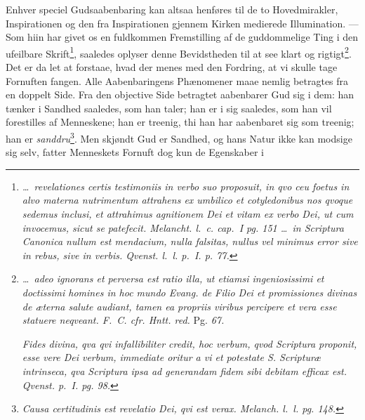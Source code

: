 \documentclass[12pt]{book}
\newcommand{\opage}[1]{\marginnote{\footnotesize\textit{[#1]}}}
\begin{document}
Enhver speciel Gudsaabenbaring kan altsaa henføres til de to Hovedmirakler,
Inspirationen og den fra Inspirationen gjennem Kirken medierede Illumination.
--- Som hiin har givet os en fuldkommen Fremstilling af de guddommelige Ting
i den ufeilbare Skrift\footnote{\textit{\ldots\ revelationes certis
testimoniis in verbo suo proposuit, in qvo ceu foetus in alvo materna
nutrimentum attrahens ex umbilico et cotyledonibus nos qvoque sedemus
inclusi, et attrahimus agnitionem Dei et vitam ex verbo Dei, ut cum
invocemus, sicut se patefecit. Melancht. l.~c. cap.~I pg. 151 \ldots\ in
Scriptura Canonica nullum est mendacium, nulla falsitas, nullus vel minimus
error sive in rebus, sive in verbis. Qvenst. l.~l. p.~I. p. 77.}}, saaledes
oplyser denne Bevidstheden
\opage{77} \setcounter{footnote}{0}%
til at see klart og rigtigt\footnote{\textit{\ldots\ adeo ignorans et perversa
est ratio illa, ut etiamsi ingeniosissimi et doctissimi homines in hoc mundo
Evang. de Filio Dei et promissiones divinas de æterna salute audiant, tamen
ea propriis viribus percipere et vera esse statuere neqveant. F.~C. cfr.
Hntt. red.} Pg. \textit{67.}

\textit{Fides divina, qva qvi infallibiliter credit, hoc verbum, qvod
Scriptura proponit, esse vere Dei verbum, immediate oritur a vi et potestate
S. Scripturæ intrinseca, qva Scriptura ipsa ad generandam fidem sibi debitam
efficax est. Qvenst. p.~I. pg. 98.}}. Det er da let at forstaae, hvad der
menes med den Fordring, at vi skulle tage Fornuften fangen. Alle
Aabenbaringens Phænomener maae nemlig betragtes fra en doppelt Side. Fra den
objective Side betragtet aabenbarer Gud sig i dem: han tænker i Sandhed
saaledes, som han taler; han er i sig saaledes, som han vil forestilles af
Menneskene; han er treenig, thi han har aabenbaret sig som treenig; han er
\emph{sanddru}\footnote{\textit{Causa certitudinis est revelatio Dei, qvi est
verax. Melanch. l.~l. pg. 148.}}. Men skjøndt Gud er Sandhed, og hans Natur
ikke kan modsige sig selv, fatter Menneskets Fornuft dog kun de Egenskaber i
\end{document}
